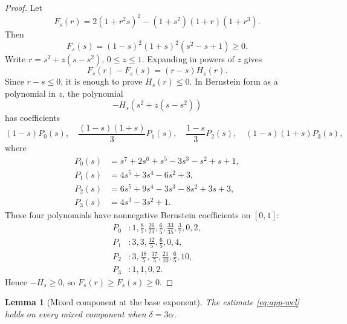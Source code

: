 \documentclass[pdflatex,sn-mathphys-num]{sn-jnl}
\numberwithin{equation}{section}
\theoremstyle{thmstyleone}
\newtheorem{lemma}[theorem]{Lemma}
\theoremstyle{thmstylethree}
\newcommand{\1}{\mathbf{1}}
\begin{document}
\begin{proof}
Let
\[
 F_s(r)=2(1+r^2s)^2-(1+s^2)(1+r)(1+r^3).
\]
Then
\[
 F_s(s)=(1-s)^2(1+s)^2(s^2-s+1)\ge0.
\]
Write $r=s^2+z(s-s^2)$, $0\le z\le1$. Expanding in powers of $z$ gives
\[
 F_s(r)-F_s(s)=(r-s)H_s(r).
\]
Since $r-s\le0$, it is enough to prove $H_s(r)\le0$. In Bernstein form as a polynomial in $z$, the polynomial
\[
 -H_s(s^2+z(s-s^2))
\]
has coefficients
\[
 (1-s)P_0(s),\quad \frac{(1-s)(1+s)}3P_1(s),\quad
 \frac{1-s}{3}P_2(s),\quad (1-s)(1+s)P_3(s),
\]
where
\begin{align*}
P_0(s)&=s^7+2s^6+s^5-3s^3-s^2+s+1,\\
P_1(s)&=4s^5+3s^4-6s^2+3,\\
P_2(s)&=6s^5+9s^4-3s^3-8s^2+3s+3,\\
P_3(s)&=4s^3-3s^2+1.
\end{align*}
These four polynomials have nonnegative Bernstein coefficients on $[0,1]$:
\begin{align*}
P_0 &: 1,\frac87,\frac{26}{21},\frac65,\frac{33}{35},\frac37,0,2,\\
P_1 &: 3,3,\frac{12}{5},\frac65,0,4,\\
P_2 &: 3,\frac{18}{5},\frac{17}{5},\frac{21}{10},\frac65,10,\\
P_3 &: 1,1,0,2.
\end{align*}
Hence $-H_s\ge0$, so $F_s(r)\ge F_s(s)\ge0$.
\end{proof}

\begin{lemma}[Mixed component at the base exponent]\label{lem:app-mixed-component}
The estimate \eqref{eq:app-wcl} holds on every mixed component when $\delta=3\alpha$.
\end{lemma}
\end{document}
